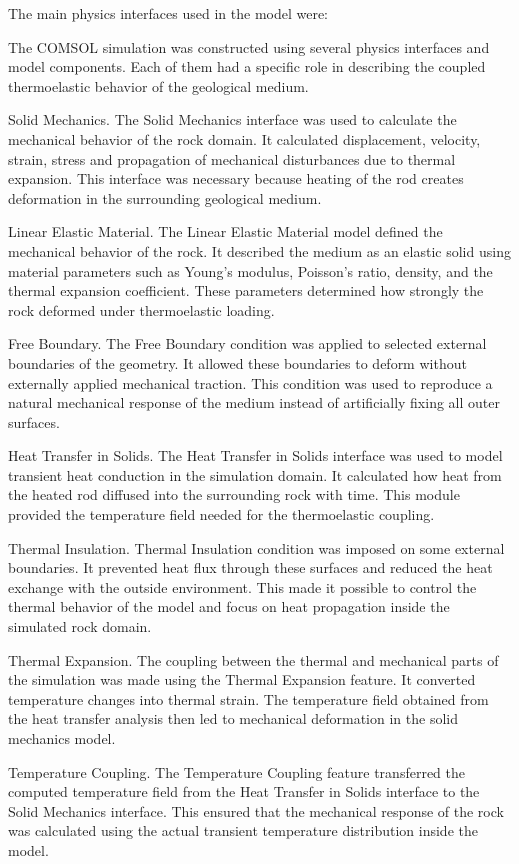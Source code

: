 The main physics interfaces used in the model were:

The COMSOL simulation was constructed using several physics interfaces and model components. Each of them had a specific role in describing the coupled thermoelastic behavior of the geological medium.

Solid Mechanics.
The Solid Mechanics interface was used to calculate the mechanical behavior of the rock domain. It calculated displacement, velocity, strain, stress and propagation of mechanical disturbances due to thermal expansion. This interface was necessary because heating of the rod creates deformation in the surrounding geological medium.

Linear Elastic Material.
The Linear Elastic Material model defined the mechanical behavior of the rock. It described the medium as an elastic solid using material parameters such as Young's modulus, Poisson's ratio, density, and the thermal expansion coefficient. These parameters determined how strongly the rock deformed under thermoelastic loading.

Free Boundary.
The Free Boundary condition was applied to selected external boundaries of the geometry. It allowed these boundaries to deform without externally applied mechanical traction. This condition was used to reproduce a natural mechanical response of the medium instead of artificially fixing all outer surfaces.

Heat Transfer in Solids.
The Heat Transfer in Solids interface was used to model transient heat conduction in the simulation domain. It calculated how heat from the heated rod diffused into the surrounding rock with time. This module provided the temperature field needed for the thermoelastic coupling.

Thermal Insulation.
Thermal Insulation condition was imposed on some external boundaries. It prevented heat flux through these surfaces and reduced the heat exchange with the outside environment. This made it possible to control the thermal behavior of the model and focus on heat propagation inside the simulated rock domain.

Thermal Expansion.
The coupling between the thermal and mechanical parts of the simulation was made using the Thermal Expansion feature. It converted temperature changes into thermal strain. The temperature field obtained from the heat transfer analysis then led to mechanical deformation in the solid mechanics model.

Temperature Coupling.
The Temperature Coupling feature transferred the computed temperature field from the Heat Transfer in Solids interface to the Solid Mechanics interface. This ensured that the mechanical response of the rock was calculated using the actual transient temperature distribution inside the model.

